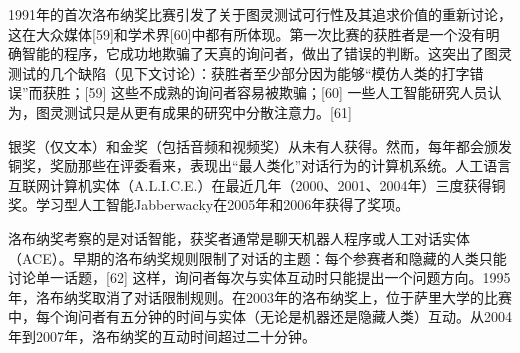 1991年的首次洛布纳奖比赛引发了关于图灵测试可行性及其追求价值的重新讨论，这在大众媒体[59]和学术界[60]中都有所体现。第一次比赛的获胜者是一个没有明确智能的程序，它成功地欺骗了天真的询问者，做出了错误的判断。这突出了图灵测试的几个缺陷（见下文讨论）：获胜者至少部分因为能够“模仿人类的打字错误”而获胜；[59] 这些不成熟的询问者容易被欺骗；[60] 一些人工智能研究人员认为，图灵测试只是从更有成果的研究中分散注意力。[61]

银奖（仅文本）和金奖（包括音频和视频奖）从未有人获得。然而，每年都会颁发铜奖，奖励那些在评委看来，表现出“最人类化”对话行为的计算机系统。人工语言互联网计算机实体（A.L.I.C.E.）在最近几年（2000、2001、2004年）三度获得铜奖。学习型人工智能Jabberwacky在2005年和2006年获得了奖项。

洛布纳奖考察的是对话智能，获奖者通常是聊天机器人程序或人工对话实体（ACE）。早期的洛布纳奖规则限制了对话的主题：每个参赛者和隐藏的人类只能讨论单一话题，[62] 这样，询问者每次与实体互动时只能提出一个问题方向。1995年，洛布纳奖取消了对话限制规则。在2003年的洛布纳奖上，位于萨里大学的比赛中，每个询问者有五分钟的时间与实体（无论是机器还是隐藏人类）互动。从2004年到2007年，洛布纳奖的互动时间超过二十分钟。